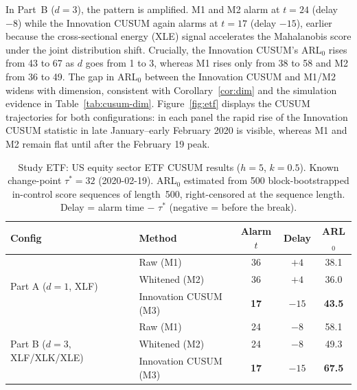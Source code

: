 \documentclass[bj,authoryear]{imsart}
\theoremstyle{plain}
\theoremstyle{definition}
\begin{document}
In Part~B ($d=3$), the pattern is amplified.  M1 and M2 alarm at $t=24$
(delay $-8$) while the Innovation CUSUM again alarms at $t=17$ (delay $-15$), earlier
because the cross-sectional energy (XLE) signal accelerates the Mahalanobis
score under the joint distribution shift.  Crucially, the Innovation CUSUM's ARL$_0$
rises from 43 to 67 as $d$ goes from 1 to 3, whereas M1 rises only from 38
to 58 and M2 from 36 to 49.  The gap in ARL$_0$ between the Innovation CUSUM and M1/M2
widens with dimension, consistent with Corollary~\ref{cor:dim} and the
simulation evidence in Table~\ref{tab:cusum-dim}.
Figure~\ref{fig:etf} displays the CUSUM trajectories for
both configurations: in each panel the rapid rise of the Innovation CUSUM statistic
in late January--early February 2020 is visible, whereas M1 and M2 remain
flat until after the February 19 peak.

\begin{table}[ht]
\centering
\caption{Study ETF: US equity sector ETF CUSUM results ($h=5$, $k=0.5$).
  Known change-point $\tau^*=32$ (2020-02-19).
  ARL$_0$ estimated from 500 block-bootstrapped in-control score sequences
  of length~500, right-censored at the sequence length.
  Delay = alarm time $-$ $\tau^*$ (negative = before the break).}
\label{tab:etf}
\small
\begin{tabular}{llccc}
\toprule
Config & Method & Alarm $t$ & Delay & ARL$_0$ \\
\midrule
\multirow{3}{*}{Part A ($d=1$, XLF)}
  & Raw (M1)        & 36 & $+4$  & 38.1 \\
  & Whitened (M2)   & 36 & $+4$  & 36.0 \\
  & Innovation CUSUM (M3)  & \textbf{17} & $-15$ & \textbf{43.5} \\
\midrule
\multirow{3}{*}{Part B ($d=3$, XLF/XLK/XLE)}
  & Raw (M1)        & 24 & $-8$  & 58.1 \\
  & Whitened (M2)   & 24 & $-8$  & 49.3 \\
  & Innovation CUSUM (M3)  & \textbf{17} & $-15$ & \textbf{67.5} \\
\bottomrule
\end{tabular}
\end{table}
\end{document}
